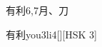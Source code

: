 \begin{entry}{有利}{6,7}{⽉、⼑}
  \begin{phonetics}{有利}{you3li4}[][HSK 3]
  \end{phonetics}
\end{entry}
